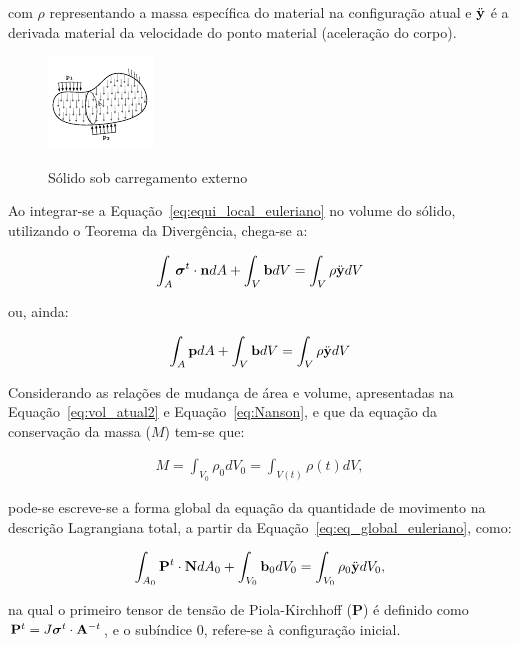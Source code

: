 \noindent com $\rho$ representando a massa específica do material na configuração atual e $\ddot{\mathbf{y}}$ é a derivada material da velocidade do ponto material (aceleração do corpo).

\begin{figure}[!htbp]
	\caption{Sólido sob carregamento externo}
	\centering
	\includegraphics[scale=4,trim=0cm 0.0cm 0cm 0cm, clip=true]{Imagens/Cap4/sol_cargas.pdf}	
	\label{fig:sol_cargas}
\end{figure}

Ao integrar-se a Equação~\eqref{eq:equi_local_euleriano} no volume do sólido, utilizando o Teorema da Divergência, chega-se a:

\begin{align}
	\int_{A} {\boldsymbol{\sigma}}^{t} \cdot \mathbf{n} dA + \int_{V} \mathbf{b} dV = \int_{V} \rho  \ddot{\mathbf{y}} dV \label{eq:eq_global_euleriano}
\end{align}

\noindent ou, ainda:

\begin{align}
	\int_{A} \mathbf{p} dA + \int_{V} \mathbf{b} dV = \int_{V} \rho  \ddot{\mathbf{y}} dV 
\end{align}

Considerando as relações de mudança de área e volume, apresentadas na Equação~\eqref{eq:vol_atual2} e Equação~\eqref{eq:Nanson}, e que da equação da conservação da massa ($M$) tem-se que:

\begin{align}
	M = \int_{V_{0}} \rho_{0}dV_{0} = \int_{V(t)} \rho(t)dV, \label{eq:conser_massa}
\end{align}

\noindent pode-se escreve-se a forma global da equação da quantidade de movimento na descrição Lagrangiana total, a partir da Equação~\eqref{eq:eq_global_euleriano}, como:

\begin{align}
	\int_{A_0} \mathbf{P}^t \cdot \mathbf{N} dA_0 + \int_{V_0} \mathbf{b}_0 dV_0 = \int_{V_0} \rho_0  \ddot{\mathbf{y}} dV_0, \label{eq:equi_global_lagrangeano}
\end{align}

\noindent na qual o primeiro tensor de tensão de Piola-Kirchhoff ($\mathbf{P}$) é definido como $\mathbf{P}^t = J \boldsymbol{\sigma}^t \cdot \mathbf{A}^{-t}$, e o subíndice $0$, refere-se à configuração inicial.


